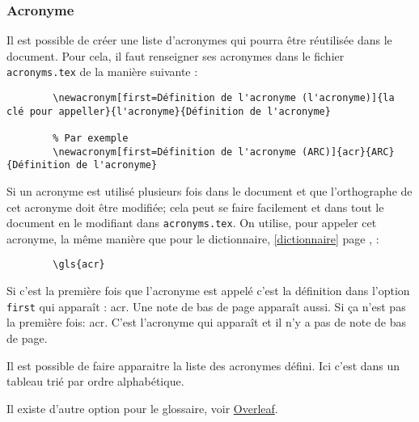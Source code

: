 \subsubsection{Acronyme} \label{acronyme}
Il est possible de créer une liste d'acronymes qui pourra être réutilisée dans le document.
Pour cela, il faut renseigner ses acronymes dans le fichier \verb=acronyms.tex= de la manière suivante :
\begin{code}
    \begin{verbatim}
        \newacronym[first=Définition de l'acronyme (l'acronyme)]{la clé pour appeller}{l'acronyme}{Définition de l'acronyme}

        % Par exemple
        \newacronym[first=Définition de l'acronyme (ARC)]{acr}{ARC}{Définition de l'acronyme}
\end{verbatim}
    \caption{Définition d'un acronyme}
\end{code}

Si un acronyme est utilisé plusieurs fois dans le document et que l'orthographe de cet acronyme doit être modifiée;
cela peut se faire facilement et dans tout le document en le modifiant dans \verb=acronyms.tex=.
On utilise, pour appeler cet acronyme, la même manière que pour le dictionnaire, \ref{dictionnaire} page \pageref{dictionnaire}, :
\begin{code}
    \begin{verbatim}
        \gls{acr}
\end{verbatim}
    \caption{Utilisation d'un acronyme}
\end{code}

Si c'est la première fois que l'acronyme est appelé c'est la définition dans l'option \verb=first= qui apparaît : \gls{acr}.
Une note de bas de page apparaît aussi. \newline
Si ça n'est pas la première fois: \gls{acr}. C'est l'acronyme qui apparaît et il n'y a pas de note de bas de page. \newline

Il est possible de faire apparaitre la liste des acronymes défini. Ici c'est dans un tableau trié par ordre alphabétique.

\printglossary[type=\acronymtype,style=superheaderborder ,title={Définitions, acronymes et abréviations}]
\glsaddallunused \newline %


Il existe d'autre option pour le glossaire, voir \href{https://fr.overleaf.com/learn/latex/Glossaries}{Overleaf}.

